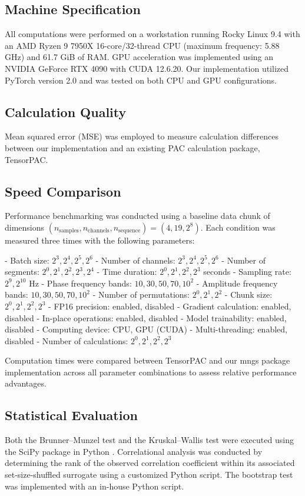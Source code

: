 \subsection{Machine Specification}
All computations were performed on a workstation running Rocky Linux 9.4 with an AMD Ryzen 9 7950X 16-core/32-thread CPU (maximum frequency: 5.88 GHz) and 61.7 GiB of RAM. GPU acceleration was implemented using an NVIDIA GeForce RTX 4090 with CUDA 12.6.20. Our implementation utilized PyTorch version 2.0 \cite{paszke_pytorch_2019} and was tested on both CPU and GPU configurations.

\subsection{Calculation Quality}
Mean squared error (MSE) was employed to measure calculation differences between our implementation and an existing PAC calculation package, TensorPAC.


\subsection{Speed Comparison}
Performance benchmarking was conducted using a baseline data chunk of dimensions $(n_\text{samples}, n_\text{channels}, n_\text{sequence}) = (4, 19, 2^8)$. Each condition was measured three times with the following parameters:

- Batch size: $2^3, 2^4, 2^5, 2^6$
- Number of channels: $2^3, 2^4, 2^5, 2^6$
- Number of segments: $2^0, 2^1, 2^2, 2^3, 2^4$
- Time duration: $2^0, 2^1, 2^2, 2^3$ seconds
- Sampling rate: $2^9, 2^{10}$ Hz
- Phase frequency bands: $10, 30, 50, 70, 10^2$
- Amplitude frequency bands: $10, 30, 50, 70, 10^2$
- Number of permutations: $2^0, 2^1, 2^2$
- Chunk size: $2^0, 2^1, 2^2, 2^3$
- FP16 precision: enabled, disabled
- Gradient calculation: enabled, disabled
- In-place operations: enabled, disabled
- Model trainability: enabled, disabled
- Computing device: CPU, GPU (CUDA)
- Multi-threading: enabled, disabled
- Number of calculations: $2^0, 2^1, 2^2, 2^3$

Computation times were compared between TensorPAC and our mngs package implementation across all parameter combinations to assess relative performance advantages.



\subsection{Statistical Evaluation}
Both the Brunner--Munzel test and the Kruskal--Wallis test were executed using the SciPy package in Python \cite{virtanen_scipy_2020}. Correlational analysis was conducted by determining the rank of the observed correlation coefficient within its associated set-size-shuffled surrogate using a customized Python script. The bootstrap test was implemented with an in-house Python script.
\label{sec:methods}

